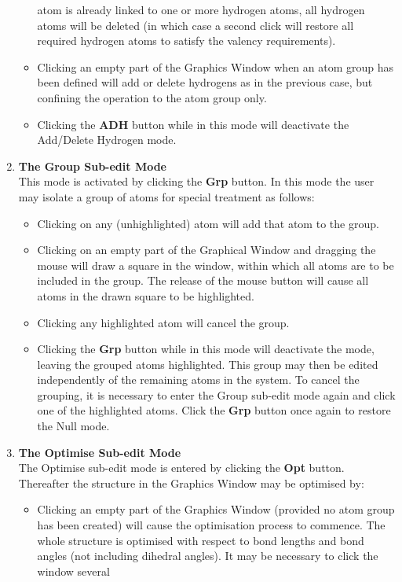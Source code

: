 \begin{enumerate}
\begin{itemize}
  atom is already linked to one or more hydrogen atoms, all hydrogen atoms
  will be deleted (in which case a second click will restore all required
  hydrogen atoms to satisfy the valency requirements).  
\item Clicking an empty part of the Graphics Window when an atom group has
  been defined will add or delete hydrogens as in the previous case, but
  confining the operation to the atom group only.  
\item Clicking the {\bf ADH} button while in this mode will deactivate the
  Add/Delete Hydrogen mode.
\end{itemize}
\item {\bf The Group Sub-edit Mode}\\
  This mode is activated by clicking the {\bf Grp} button. In this mode the
  user may isolate a group of atoms for special treatment as follows:
\begin{itemize}
\item Clicking on any (unhighlighted) atom will add that atom to the group.
\item Clicking on an empty part of the Graphical Window and dragging the mouse
  will draw a square in the window, within which all atoms are to be included
  in the group. The release of the mouse button will cause all atoms in the
  drawn square to be highlighted.  
\item Clicking any highlighted atom will cancel the group.  
\item Clicking the {\bf Grp} button while in this mode will deactivate the
  mode, leaving the grouped atoms highlighted. This group may then be edited
  independently of the remaining atoms in the system. To cancel the grouping,
  it is necessary to enter the Group sub-edit mode again and click one of the
  highlighted atoms.  Click the {\bf Grp} button once again to restore the
  Null mode.
\end{itemize}
\item {\bf The Optimise Sub-edit Mode}\\
  The Optimise sub-edit mode is entered by clicking the {\bf Opt} button.
  Thereafter the structure in the Graphics Window may be optimised by:
\begin{itemize}
\item Clicking an empty part of the Graphics Window (provided no atom group
  has been created) will cause the optimisation process to commence. The whole
  structure is optimised with respect to bond lengths and bond angles (not
  including dihedral angles). It may be necessary to click the window several

\end{itemize}
\end{enumerate}
